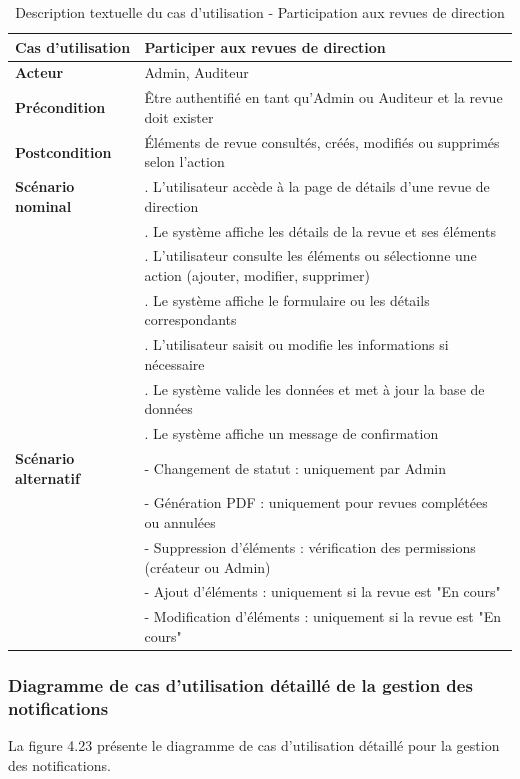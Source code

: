 \begin{longtable}{|>{\raggedright\arraybackslash}p{4cm}|>{\raggedright\arraybackslash}p{9cm}|}
\caption{Description textuelle du cas d'utilisation - Participation aux revues de direction}
\label{tab:participate_direction_reviews_usecase} \\
\hline
\textbf{Cas d'utilisation} & \textbf{Participer aux revues de direction} \\
\hline
\textbf{Acteur} & Admin, Auditeur \\
\hline
\textbf{Précondition} & Être authentifié en tant qu'Admin ou Auditeur et la revue doit exister \\
\hline
\textbf{Postcondition} & Éléments de revue consultés, créés, modifiés ou supprimés selon l'action \\
\hline
\textbf{Scénario nominal} & 
1. L'utilisateur accède à la page de détails d'une revue de direction \\
& 2. Le système affiche les détails de la revue et ses éléments \\
& 3. L'utilisateur consulte les éléments ou sélectionne une action (ajouter, modifier, supprimer) \\
& 4. Le système affiche le formulaire ou les détails correspondants \\
& 5. L'utilisateur saisit ou modifie les informations si nécessaire \\
& 6. Le système valide les données et met à jour la base de données \\
& 7. Le système affiche un message de confirmation \\
\hline
\textbf{Scénario alternatif} & 
- Changement de statut : uniquement par Admin \\
& - Génération PDF : uniquement pour revues complétées ou annulées \\
& - Suppression d'éléments : vérification des permissions (créateur ou Admin) \\
& - Ajout d'éléments : uniquement si la revue est "En cours" \\
& - Modification d'éléments : uniquement si la revue est "En cours" \\
\hline
\end{longtable}

\subsubsection{Diagramme de cas d'utilisation détaillé de la gestion des notifications}
\noindent La figure 4.23 présente le diagramme de cas d'utilisation détaillé pour la gestion des notifications.

